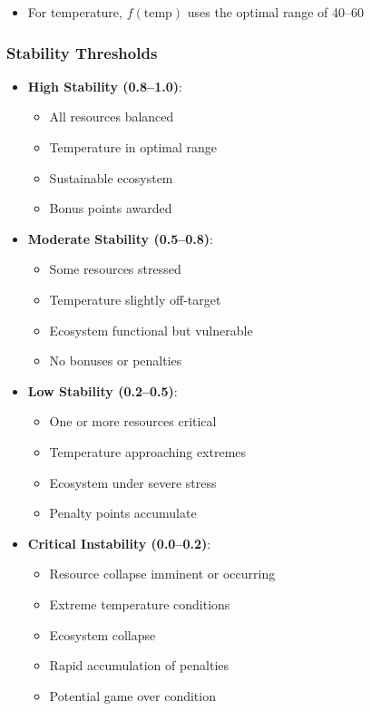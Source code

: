 \documentclass[12pt,a4paper]{article}
\begin{document}
\begin{itemize}
    \item For temperature, $ f(\text{temp}) $ uses the optimal range of 40--60
\end{itemize}

\subsubsection{Stability Thresholds}

\begin{itemize}
    \item \textbf{High Stability (0.8--1.0)}:
    \begin{itemize}
        \item All resources balanced
        \item Temperature in optimal range
        \item Sustainable ecosystem
        \item Bonus points awarded
    \end{itemize}
    
    \item \textbf{Moderate Stability (0.5--0.8)}:
    \begin{itemize}
        \item Some resources stressed
        \item Temperature slightly off-target
        \item Ecosystem functional but vulnerable
        \item No bonuses or penalties
    \end{itemize}
    
    \item \textbf{Low Stability (0.2--0.5)}:
    \begin{itemize}
        \item One or more resources critical
        \item Temperature approaching extremes
        \item Ecosystem under severe stress
        \item Penalty points accumulate
    \end{itemize}
    
    \item \textbf{Critical Instability (0.0--0.2)}:
    \begin{itemize}
        \item Resource collapse imminent or occurring
        \item Extreme temperature conditions
        \item Ecosystem collapse
        \item Rapid accumulation of penalties
        \item Potential game over condition
    \end{itemize}
\end{itemize}
\end{document}
